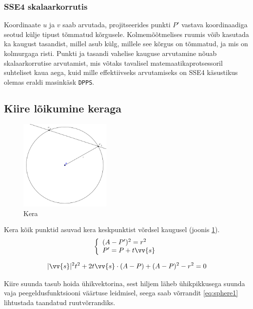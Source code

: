 \documentclass[a4paper,12pt]{report}
\renewcommand{\vec}[1]{\vv{#1}}
\begin{document}
\subsubsection{SSE4 skalaarkorrutis}
Koordinaate \(u\) ja \(v\) saab arvutada, projitseerides punkti \(P'\)
vastava koordinaadiga seotud külje tipust tõmmatud kõrgusele. Kolmemõõtmelises
ruumis võib kasutada ka kaugust tasandist, millel asub külg, millele see
kõrgus on tõmmatud, ja mis on kolmurgaga risti. Punkti ja tasandi vahelise
kauguse arvutamine nõuab skalaarkorrutise arvutamist, mis võtaks tavalisel
matemaatikaprotsessoril suhteliset kaua aega, kuid mille effektiivseks 
arvutamiseks on SSE4 käsustikus olemas eraldi masinkäsk \texttt{DPPS}.
\cite{TriSSE4}

\subsection{Kiire lõikumine keraga}
\begin{figure}
\includegraphics[width=0.4\textwidth]{sphere}
\caption{Kera}
\label{fig:sphere}
\end{figure}
Kera kõik punktid asuvad kera keskpunktist võrdsel kaugusel (joonis \ref{fig:sphere}).
\begin{equation} 
\left\{
\begin{array}{l}
(A - P')^2 = r^2 \\
P' = P + t\vec s
\end{array}
\right.
\end{equation}

\begin{equation} \label{eq:sphere1}
|\vec s|^2 t^2 + 2 t \vec s \cdot (A-P) + (A-P)^2 - r^2 = 0
\end{equation}

Kiire suunda tasub hoida ühikvektorina, sest hiljem läheb ühikpikkusega
suunda vaja peegeldusfunktsiooni väärtuse leidmisel, seega saab võrrandit
\ref{eq:sphere1} lihtustada taandatud ruutvõrrandiks.
\end{document}
